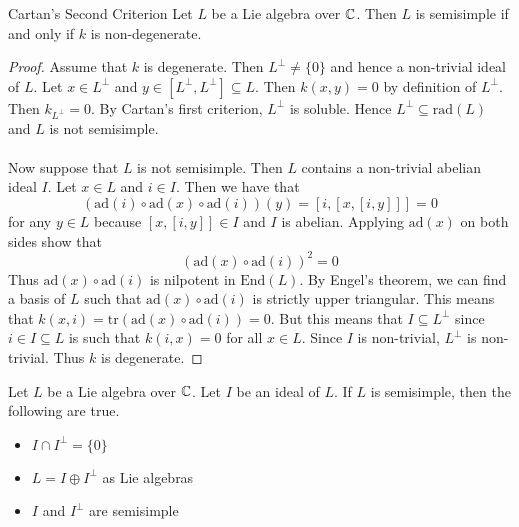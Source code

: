 \documentclass[a4paper]{article}
\begin{document}
\begin{thm}{Cartan's Second Criterion}{} Let $L$ be a Lie algebra over $\mathbb{C}$. Then $L$ is semisimple if and only if $k$ is non-degenerate. \tcbline
\begin{proof}
Assume that $k$ is degenerate. Then $L^\perp\neq\{0\}$ and hence a non-trivial ideal of $L$. Let $x\in L^\perp$ and $y\in[L^\perp,L^\perp]\subseteq L$. Then $k(x,y)=0$ by definition of $L^\perp$. Then $k_{L^\perp}=0$. By Cartan's first criterion, $L^\perp$ is soluble. Hence $L^\perp\subseteq\text{rad}(L)$ and $L$ is not semisimple. \\~\\

Now suppose that $L$ is not semisimple. Then $L$ contains a non-trivial abelian ideal $I$. Let $x\in L$ and $i\in I$. Then we have that $$\left(\text{ad}(i)\circ\text{ad}(x)\circ\text{ad}(i)\right)(y)=[i,[x,[i,y]]]=0$$ for any $y\in L$ because $[x,[i,y]]\in I$ and $I$ is abelian. Applying $\text{ad}(x)$ on both sides show that $$\left(\text{ad}(x)\circ\text{ad}(i)\right)^2=0$$ Thus $\text{ad}(x)\circ\text{ad}(i)$ is nilpotent in $\text{End}(L)$. By Engel's theorem, we can find a basis of $L$ such that $\text{ad}(x)\circ\text{ad}(i)$ is strictly upper triangular. This means that $k(x,i)=\text{tr}(\text{ad}(x)\circ\text{ad}(i))=0$. But this means that $I\subseteq L^\perp$ since $i\in I\subseteq L$ is such that $k(i,x)=0$ for all $x\in L$. Since $I$ is non-trivial, $L^\perp$ is non-trivial. Thus $k$ is degenerate. 
\end{proof}
\end{thm}

\begin{lmm}{}{} Let $L$ be a Lie algebra over $\mathbb{C}$. Let $I$ be an ideal of $L$. If $L$ is semisimple, then the following are true. 
\begin{itemize}
\item $I\cap I^\perp=\{0\}$
\item $L=I\oplus I^\perp$ as Lie algebras
\item $I$ and $I^\perp$ are semisimple
\end{itemize}
\end{lmm}
\end{document}
